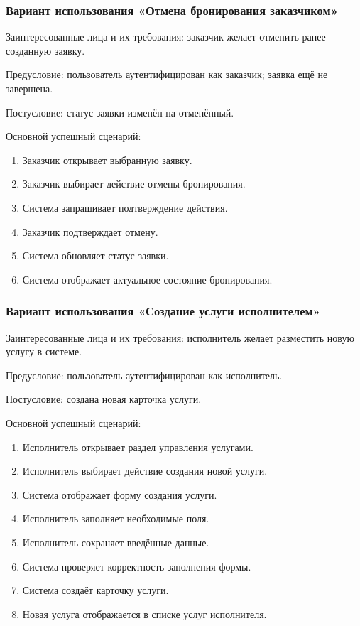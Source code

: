 \subsubsection{Вариант использования «Отмена бронирования заказчиком»}

Заинтересованные лица и их требования: заказчик желает отменить ранее созданную заявку.

Предусловие: пользователь аутентифицирован как заказчик; заявка ещё не завершена.

Постусловие: статус заявки изменён на отменённый.

Основной успешный сценарий:
\begin{enumerate}
	\item Заказчик открывает выбранную заявку.
	\item Заказчик выбирает действие отмены бронирования.
	\item Система запрашивает подтверждение действия.
	\item Заказчик подтверждает отмену.
	\item Система обновляет статус заявки.
	\item Система отображает актуальное состояние бронирования.
\end{enumerate}

\subsubsection{Вариант использования «Создание услуги исполнителем»}

Заинтересованные лица и их требования: исполнитель желает разместить новую услугу в системе.

Предусловие: пользователь аутентифицирован как исполнитель.

Постусловие: создана новая карточка услуги.

Основной успешный сценарий:
\begin{enumerate}
	\item Исполнитель открывает раздел управления услугами.
	\item Исполнитель выбирает действие создания новой услуги.
	\item Система отображает форму создания услуги.
	\item Исполнитель заполняет необходимые поля.
	\item Исполнитель сохраняет введённые данные.
	\item Система проверяет корректность заполнения формы.
	\item Система создаёт карточку услуги.
	\item Новая услуга отображается в списке услуг исполнителя.
\end{enumerate}

